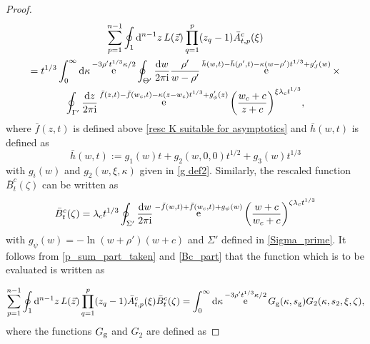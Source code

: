 \documentclass[cmp]{svjour}
\numberwithin{theorem}{section}
\numberwithin{equation}{section}
\DeclareMathOperator{\e}{e}
\def\dd{{\rm d}}
\def\ii{{\rm i}}
\begin{document}
\begin{proof}
\begin{multline}
\label{p_sum_part_taken}
\sum_{p=1}^{n-1} \oint_1 \dd^{n-1} z\,  L(\vec{z}) \prod_{q=1}^{p}(z_q-1) \bar{A}^c_{t,p}(\xi) \\
=  t^{1/3} \int_{0}^{\infty} \dd \kappa \e^{-3 \rho' t^{1/3} \kappa/2 } \oint_{\Theta'} \frac{\dd w}{2 \pi \ii} \frac{\rho'}{w - \rho'}  \e^{\bar{h}(w,t)-\bar{h}(\rho',t) - \kappa (w - \rho') t^{1/3} + g'_J(w)} \times \\ \oint_{\Gamma'} \frac{\dd z}{2 \pi \ii}  \e^{\bar{f}(z,t)-\bar{f}(w_c,t) - \kappa (z - w_c) t^{1/3} + g'_{\phi}(z)}  {\left( \frac{w_c + c}{z + c} \right)}^{\xi \lambda_c t^{1/3}},
\end{multline}
where $\bar{f}(z , t)$ is defined above \eqref{resc K suitable for asymptotics} and $\bar{h}(w , t)$ is defined as
\begin{equation*}
\bar{h}(w, t) := g_1(w) t + g_2(w , 0 ,0) t^{1/2} + g_3(w) t^{1/3}
\end{equation*}
with $g_i(w)$ and $g_2(w, \xi , \kappa)$ given in \eqref{g def2}.
Similarly, the rescaled function $\bar{B}^c_t(\zeta)$ can be written as
\begin{equation}
\label{Bc_part}
\bar{B}^c_t(\zeta) = \lambda_c t^{1/3} \oint_{\Sigma'} \frac{\dd w}{2 \pi \ii} \e^{-\bar{f}(w,t) + \bar{f}(w_c,t) + g_{\psi}(w)} {\left( \frac{w+c}{w_c + c} \right)}^{\zeta \lambda_c t^{1/3}}
\end{equation}
with $g_{\psi}(w) = - \ln{(w + \rho')(w + c)}$ and $\Sigma'$ defined in \eqref{Sigma_prime}.
It follows from \eqref{p_sum_part_taken} and \eqref{Bc_part} that the function which is to be evaluated is written as

\begin{equation*}
\sum_{p=1}^{n-1} \oint_1 \dd^{n-1} z\,  L(\vec{z}) \prod_{q=1}^{p}(z_q-1) \bar{A}^c_{t,p}(\xi) \bar{B}^c_t(\zeta) = \int_{0}^{\infty} \dd \kappa \e^{-3 \rho' t^{1/3} \kappa / 2} G_{\rm g}(\kappa, s_{\rm g}) G_2(\kappa, s_2 , \xi , \zeta) ,
\end{equation*}
where the functions $G_{\rm g}$ and $G_2$ are defined as
 

\end{proof}
\end{document}
